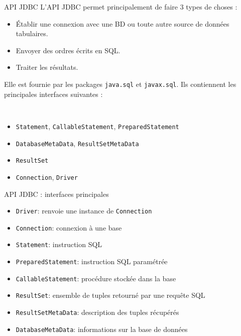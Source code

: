 \documentclass[xcolor=pdftex,x11names,table]{beamer}
\begin{document}
    \begin{frame}{API JDBC}
      L'API JDBC permet principalement de faire 3 types de choses : 
      \begin{itemize}
        \item Établir une connexion avec une BD ou toute autre source de données tabulaires.
        \item Envoyer des ordres écrits en SQL.
        \item Traiter les résultats.
      \end{itemize}\pause
      Elle est fournie par les packages \lstinline$java.sql$ et \lstinline$javax.sql$. 
      Ils contiennent les principales interfaces suivantes : 
      {\tt 
      \begin{itemize}
        \item \lstinline$Statement$, \lstinline$CallableStatement$, \lstinline$PreparedStatement$
        \item \lstinline$DatabaseMetaData$, \lstinline$ResultSetMetaData$
        \item \lstinline$ResultSet$
        \item \lstinline$Connection$, \lstinline$Driver$
      \end{itemize}
      }
    \end{frame}

    \begin{frame}{API JDBC : interfaces principales}
      \begin{itemize}
        \item \lstinline$Driver$: renvoie une instance de \lstinline$Connection$
        \item \lstinline$Connection$: connexion à une base
        \item \lstinline$Statement$: instruction SQL
        \item \lstinline$PreparedStatement$: instruction SQL paramétrée
        \item \lstinline$CallableStatement$: procédure stockée dans la base
        \item \lstinline$ResultSet$: ensemble de tuples retourné par une requête SQL
        \item \lstinline$ResultSetMetaData$: description des tuples récupérés
        \item \lstinline$DatabaseMetaData$: informations sur la base de données
      \end{itemize}    
    \end{frame}    
    
\end{document}
